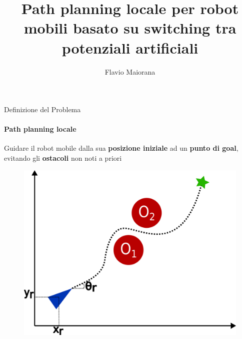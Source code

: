\documentclass[handout]{beamer}
\title{Path planning locale per robot mobili basato su switching tra potenziali artificiali}
\author{Flavio Maiorana}
\date{}
\begin{document}
\frame{\maketitle}

\begin{frame}{Definizione del Problema}
\framesubtitle{Path planning locale}
Guidare il robot mobile dalla sua \textbf{posizione iniziale} ad un \textbf{punto di goal}, evitando gli \textbf{ostacoli} non noti a priori
\begin{figure}
\centering
\includegraphics[scale=0.45]{pathplanning.png}
\end{figure}
\end{frame}
\end{document}
